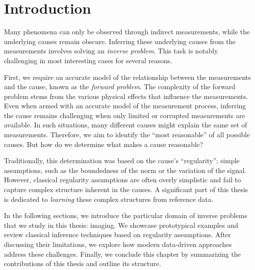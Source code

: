 \chapter{Introduction}%
\label{chap:intro}%
Many phenomena can only be observed through indirect measurements, while the underlying causes remain obscure.
Inferring these underlying causes from the measurements involves solving an \emph{inverse problem}.
This task is notably challenging in most interesting cases for several reasons.

First, we require an accurate model of the relationship between the measurements and the cause, known as the \emph{forward problem}.
The complexity of the forward problem stems from the various physical effects that influence the measurements.
Even when armed with an accurate model of the measurement process, inferring the cause remains challenging when only limited or corrupted measurements are available.
In such situations, many different causes might explain the same set of measurements.
Therefore, we aim to identify the \enquote{most reasonable} of all possible causes.
But how do we determine what makes a cause reasonable?

Traditionally, this determination was based on the cause's \enquote{regularity}; simple assumptions, such as the boundedness of the norm or the variation of the signal.
However, classical regularity assumptions are often overly simplistic and fail to capture complex structure inherent in the causes.
A significant part of this thesis is dedicated to \emph{learning} these complex structures from reference data.

In the following sections, we introduce the particular domain of inverse problems that we study in this thesis: imaging.
We showcase prototypical examples and review classical inference techniques based on regularity assumptions.
After discussing their limitations, we explore how modern data-driven approaches address these challenges.
Finally, we conclude this chapter by summarizing the contributions of this thesis and outline its structure.
